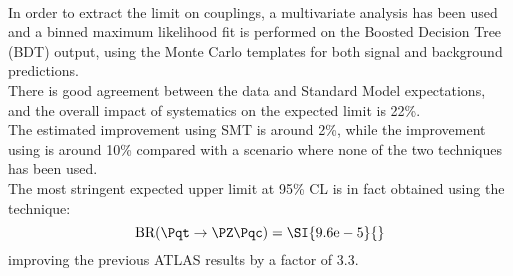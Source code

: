 \vspace{\baselineskip}
\\In order to extract the limit on \tZc couplings, a multivariate analysis has been used and a binned maximum likelihood fit is performed on the Boosted Decision Tree (BDT) output, using the Monte Carlo templates for both signal and background predictions.\\
There is good agreement between the data and Standard
Model expectations, and the overall impact of systematics on the expected limit is 22\%.\\
The estimated improvement using SMT is around 2\%, while the improvement using \DLrc is around 10\% compared with a scenario where none of the two techniques has been used.\\
The most stringent expected upper limit at 95\% CL is in fact obtained using the \DLrc technique:
\begin{equation*}
\mathrm{BR (\Pqt\rightarrow\PZ\Pqc)=\SI{9.6e-5}{}}
\end{equation*}
improving the previous ATLAS results by a factor of 3.3.
